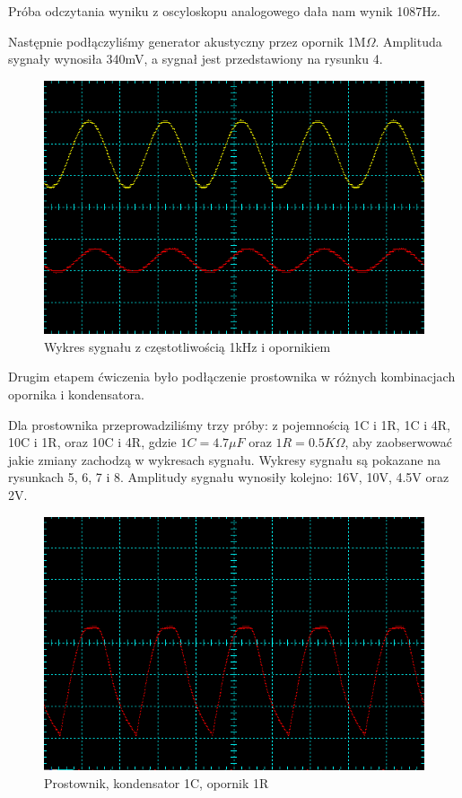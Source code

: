 \documentclass[a4paper,11pt]{article}
\begin{document}
Próba odczytania wyniku z oscyloskopu analogowego dała nam wynik 1087Hz.

Następnie podłączyliśmy generator akustyczny przez opornik 1M$\Omega$. Amplituda sygnały wynosiła 340mV, a sygnał jest przedstawiony na rysunku 4.

\begin{figure}[h]
 \begin{center}
  \includegraphics[width=12cm]{gen_akustyczny_z_opornikiem}
 \end{center}
 \caption{Wykres sygnału z częstotliwością 1kHz i opornikiem}
\end{figure}

Drugim etapem ćwiczenia było podłączenie prostownika w różnych kombinacjach opornika i kondensatora.

Dla prostownika przeprowadziliśmy trzy próby: z pojemnością 1C i 1R, 1C i 4R, 10C i 1R, oraz 10C i 4R, gdzie $1C = 4.7\mu F$ oraz $1R = 0.5K\Omega$, aby zaobserwować jakie zmiany zachodzą w wykresach sygnału. Wykresy sygnału są pokazane na rysunkach 5, 6, 7 i 8. Amplitudy sygnału wynosiły kolejno: 16V, 10V, 4.5V oraz 2V.

\begin{figure}[ht]
 \begin{center}
  \includegraphics[width=12cm]{prostownik_1C_1R}
 \end{center}
 \caption{Prostownik, kondensator 1C, opornik 1R}
\end{figure}
\end{document}

